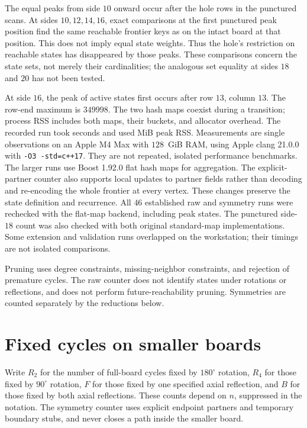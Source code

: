\documentclass[12pt]{amsart}
\begin{document}
\begin{table}[htbp]
\centering\small

\caption{Primary-counter peak states for punctured and intact boards. Time and
memory refer to punctured boards. Sides through $16$ use standard hash
maps; larger sides use Boost flat maps, so timings are not directly comparable.}
\label{tab:metrics}
\end{table}

The equal peaks from side $10$ onward occur after the hole rows in the
punctured scans. At sides $10,12,14,16$, exact comparisons at the first
punctured peak position find the same reachable frontier keys as on the
intact board at that position. This does not imply equal state weights. Thus the
hole's restriction on reachable states has disappeared by those peaks.
These comparisons concern the state sets, not merely their cardinalities;
the analogous set equality at sides $18$ and $20$ has not been tested.

At side $16$, the peak of \PeakStates{} active states first occurs after
row $13$, column $13$. The row-end maximum is $349998$. The two hash maps
coexist during a transition; process RSS includes both maps, their buckets,
and allocator overhead. The recorded run took \RunSeconds{} seconds and
used \PeakMemory{} MiB peak RSS.
Measurements are single observations on an Apple M4 Max with $128$~GiB RAM,
using Apple clang 21.0.0 with \texttt{-O3 -std=c++17}. They are not repeated,
isolated performance benchmarks. The larger runs use
Boost 1.92.0 flat hash maps for aggregation. The explicit-partner counter
also supports local updates to partner fields rather than decoding and
re-encoding the whole frontier at every vertex. These changes preserve the
state definition and recurrence. All $46$ established raw and symmetry
runs were rechecked with the flat-map backend, including peak states.
The punctured side-$18$ count was also checked with both original
standard-map implementations. Some extension and validation runs overlapped
on the workstation; their timings are not isolated comparisons.

Pruning uses degree constraints, missing-neighbor constraints, and rejection
of premature cycles. The raw counter does not identify states under
rotations or reflections, and does not perform future-reachability pruning.
Symmetries are counted separately by the reductions below.

\section{Fixed cycles on smaller boards}
Write $R_2$ for the number of full-board cycles fixed by $180^\circ$ rotation,
$R_4$ for those fixed by $90^\circ$ rotation, $F$ for those fixed by one
specified axial reflection, and $B$ for those fixed by both axial
reflections. These counts depend on $n$, suppressed in the notation.
The symmetry counter uses explicit endpoint partners and temporary boundary
stubs, and never closes a path inside the smaller board.
\end{document}
